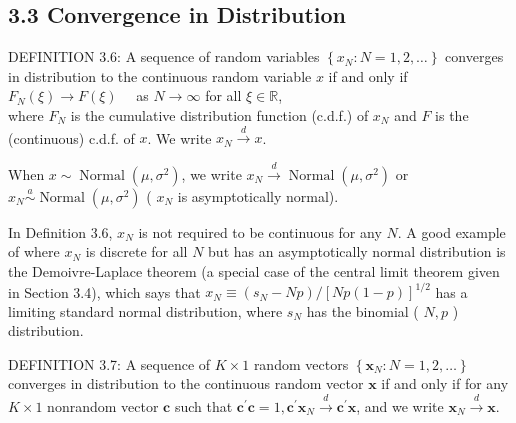 \documentclass[10pt]{article}
\begin{document}
\subsection*{3.3 Convergence in Distribution}
DEFINITION 3.6: A sequence of random variables $\left\{x_{N}: N=1,2, \ldots\right\}$ converges in distribution to the continuous random variable $x$ if and only if\\
$F_{N}(\xi) \rightarrow F(\xi) \quad$ as $N \rightarrow \infty$ for all $\xi \in \mathbb{R}$,\\
where $F_{N}$ is the cumulative distribution function (c.d.f.) of $x_{N}$ and $F$ is the (continuous) c.d.f. of $x$. We write $x_{N} \xrightarrow{d} x$.

When $x \sim \operatorname{Normal}\left(\mu, \sigma^{2}\right)$, we write $x_{N} \xrightarrow{d} \operatorname{Normal}\left(\mu, \sigma^{2}\right)$ or $x_{N} \stackrel{a}{\sim} \operatorname{Normal}\left(\mu, \sigma^{2}\right)$ ( $x_{N}$ is asymptotically normal).

In Definition 3.6, $x_{N}$ is not required to be continuous for any $N$. A good example of where $x_{N}$ is discrete for all $N$ but has an asymptotically normal distribution is the Demoivre-Laplace theorem (a special case of the central limit theorem given in Section 3.4), which says that $x_{N} \equiv\left(s_{N}-N p\right) /[N p(1-p)]^{1 / 2}$ has a limiting standard normal distribution, where $s_{N}$ has the binomial ( $N, p$ ) distribution.

DEFINITION 3.7: A sequence of $K \times 1$ random vectors $\left\{\mathbf{x}_{N}: N=1,2, \ldots\right\}$ converges in distribution to the continuous random vector $\mathbf{x}$ if and only if for any $K \times 1$ nonrandom vector $\mathbf{c}$ such that $\mathbf{c}^{\prime} \mathbf{c}=1, \mathbf{c}^{\prime} \mathbf{x}_{N} \xrightarrow{d} \mathbf{c}^{\prime} \mathbf{x}$, and we write $\mathbf{x}_{N} \xrightarrow{d} \mathbf{x}$.
\end{document}
